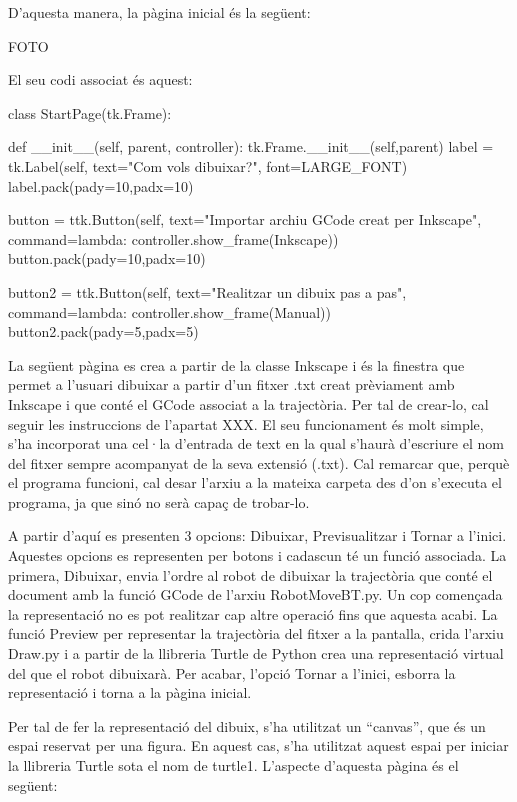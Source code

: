 D’aquesta manera, la pàgina inicial és la següent:

FOTO

El seu codi associat és aquest:

\begin{python}
	class StartPage(tk.Frame):
	
		def __init__(self, parent, controller):
			tk.Frame.__init__(self,parent)
			label = tk.Label(self, text="Com vols dibuixar?", font=LARGE_FONT)
			label.pack(pady=10,padx=10)
			
			button = ttk.Button(self, text="Importar archiu GCode creat per Inkscape",
			command=lambda: controller.show_frame(Inkscape))
			button.pack(pady=10,padx=10)
			
			button2 = ttk.Button(self, text="Realitzar un dibuix pas a pas",
			command=lambda: controller.show_frame(Manual))
			button2.pack(pady=5,padx=5)
\end{python}

La següent pàgina es crea a partir de la classe Inkscape i és la finestra que permet a l’usuari dibuixar a partir d’un fitxer .txt creat prèviament amb Inkscape i que conté el GCode associat a la trajectòria. Per tal de crear-lo, cal seguir les instruccions de l’apartat XXX. El seu funcionament és molt simple, s’ha incorporat una cel·la d’entrada de text en la qual s’haurà d’escriure el nom del fitxer sempre acompanyat de la seva extensió (.txt). Cal remarcar que, perquè el programa funcioni, cal desar l’arxiu a la mateixa carpeta des d’on s’executa el programa, ja que sinó no serà capaç de trobar-lo.
 
A partir d’aquí es presenten 3 opcions: Dibuixar, Previsualitzar i Tornar a l’inici.  Aquestes opcions es representen per botons i cadascun té un funció associada. La primera, Dibuixar, envia l’ordre al robot de dibuixar la trajectòria que conté el document amb la funció GCode de l’arxiu RobotMoveBT.py. Un cop començada la representació no es pot realitzar cap altre operació fins que aquesta acabi. La funció Preview per representar la trajectòria del fitxer a la pantalla, crida l’arxiu Draw.py i a partir de la llibreria Turtle de Python crea una representació virtual del que el robot dibuixarà. Per acabar, l’opció Tornar a l’inici, esborra la representació i torna a la pàgina inicial. 

Per tal de fer la representació del dibuix, s’ha utilitzat un “canvas”, que és un espai reservat per una figura. En aquest cas, s’ha utilitzat aquest espai per iniciar la llibreria Turtle sota el nom de turtle1. L’aspecte d’aquesta pàgina és el següent:

